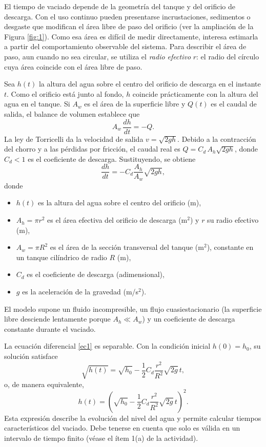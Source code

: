 \documentclass[oneside,letter,spanish,activeacute,english,links,10pt]{amcaGCS_EDO}
\begin{document}
El tiempo de vaciado depende de la geometría del tanque y del orificio de descarga. Con el uso continuo pueden presentarse incrustaciones, sedimentos o desgaste que modifican el área libre de paso del orificio (ver la ampliación de la Figura \ref{fig:1}). Como esa área es difícil de medir directamente, interesa estimarla a partir del comportamiento observable del sistema. Para describir el área de paso, aun cuando no sea circular, se utiliza el \emph{radio efectivo} $r$: el radio del círculo cuya área coincide con el área libre de paso.

Sea $h(t)$ la altura del agua sobre el centro del orificio de descarga en el instante $t$. Como el orificio está junto al fondo, $h$ coincide prácticamente con la altura del agua en el tanque. Si $A_w$ es el área de la superficie libre y $Q(t)$ es el caudal de salida, el balance de volumen establece que
$$
A_w\,\frac{dh}{dt}=-Q .
$$
La ley de Torricelli da la velocidad de salida $v=\sqrt{2gh}$. Debido a la contracción del chorro y a las pérdidas por fricción, el caudal real es $Q=C_d\,A_h\sqrt{2gh}$, donde $C_d<1$ es el coeficiente de descarga. Sustituyendo, se obtiene
\begin{equation}\label{ec1}
	\frac{d h}{d t}=-C_d \frac{A_h}{A_w} \sqrt{2 g h},
\end{equation}
donde
\begin{itemize}
	\item $h(t)$ es la altura del agua sobre el centro del orificio (m),
	\item $A_h=\pi r^2$ es el área efectiva del orificio de descarga (m$^2$) y $r$ su radio efectivo (m),
	\item $A_w=\pi R^2$ es el área de la sección transversal del tanque (m$^2$), constante en un tanque cilíndrico de radio $R$ (m),
	\item $C_d$ es el coeficiente de descarga (adimensional),
	\item $g$ es la aceleración de la gravedad (m/s$^2$).
\end{itemize}
El modelo supone un fluido incompresible, un flujo cuasiestacionario (la superficie libre desciende lentamente porque $A_h\ll A_w$) y un coeficiente de descarga constante durante el vaciado.

La ecuación diferencial \eqref{ec1} es separable. Con la condición inicial $h(0)=h_0$, su solución satisface
$$
\sqrt{h(t)}=\sqrt{h_0}-\frac{1}{2} C_d \frac{r^2}{R^2} \sqrt{2 g}\, t ,
$$
o, de manera equivalente,
\begin{equation}\label{ec2}
	h(t)=\left(\sqrt{h_0}-\frac{1}{2} C_d \frac{r^2}{R^2} \sqrt{2 g}\, t\right)^2 .
\end{equation}
Esta expresión describe la evolución del nivel del agua y permite calcular tiempos característicos del vaciado. Debe tenerse en cuenta que solo es válida en un intervalo de tiempo finito (véase el ítem 1(a) de la actividad).
\end{document}
